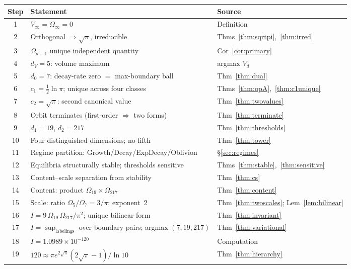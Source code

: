 \documentclass[11pt,a4paper]{article}
\begin{document}
\begin{center}
\begin{tabular}{cll}
\toprule
Step & Statement & Source \\
\midrule
1 & $V_\infty = \Omega_\infty = 0$ & Definition \\
2 & Orthogonal $\Rightarrow\sqrt{\pi}$, irreducible & Thms~\ref{thm:sqrtpi},~\ref{thm:irred} \\
3 & $\Omega_{d-1}$ unique independent quantity & Cor~\ref{cor:primary} \\
4 & $d_V = 5$: volume maximum & argmax $V_d$ \\
5 & $d_0 = 7$: decay-rate zero $=$ max-boundary ball & Thm~\ref{thm:dual} \\
6 & $c_1 = \tfrac{1}{2}\ln\pi$; unique across four classes & Thms~\ref{thm:opA},~\ref{thm:c1unique} \\
7 & $c_2 = \sqrt{\pi}$: second canonical value & Thm~\ref{thm:twovalues} \\
8 & Orbit terminates (first-order $\Rightarrow$ two forms) & Thm~\ref{thm:terminate} \\
9 & $d_1 = 19$,\; $d_2 = 217$ & Thm~\ref{thm:thresholds} \\
10 & Four distinguished dimensions; no fifth & Thm~\ref{thm:tower} \\
11 & Regime partition: Growth/Decay/ExpDecay/Oblivion & \S\ref{sec:regimes} \\
12 & Equilibria structurally stable; thresholds sensitive & Thms~\ref{thm:stable},~\ref{thm:sensitive} \\
13 & Content--scale separation from stability & Thm~\ref{thm:cs} \\
14 & Content: product $\Omega_{19}\times\Omega_{217}$ & Thm~\ref{thm:content} \\
15 & Scale: ratio $\Omega_5/\Omega_7 = 3/\pi$; exponent~2 & Thm~\ref{thm:twoscales}; Lem~\ref{lem:bilinear} \\
16 & $I = 9\,\Omega_{19}\,\Omega_{217}/\pi^2$; unique bilinear form & Thm~\ref{thm:invariant} \\
17 & $I = \sup_{\text{labelings}}$ over boundary pairs; argmax $(7,19,217)$ & Thm~\ref{thm:variational} \\
18 & $I = 1.0989\times 10^{-120}$ & Computation \\
19 & $120\approx\pi e^{2\sqrt{\pi}}(2\sqrt{\pi}-1)/\ln 10$ & Thm~\ref{thm:hierarchy} \\
\bottomrule
\end{tabular}
\end{center}
\end{document}
